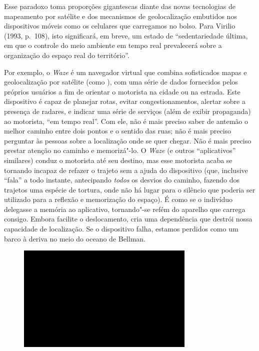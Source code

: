 Esse paradoxo toma proporções gigantescas diante das novas tecnologias
de mapeamento por satélite e dos mecanismos de geolocalização
embutidos nos dispositivos móveis como os celulares que carregamos no
bolso. Para Virilio (1993, p.~108), isto significará, em breve, um
estado de ``sedentariedade última, em que o controle do meio ambiente em
tempo real prevalecerá sobre a organização do espaço real do
território''.

Por exemplo, o \emph{Waze} é um navegador virtual que combina sofisticados
mapas e geolocalização por satélite (como ), com uma série de dados
fornecidos pelos próprios usuários a fim de orientar o motorista na
cidade ou na estrada. Este dispositivo é capaz de planejar rotas, evitar
congestionamentos, alertar sobre a presença de radares, e indicar uma
série de serviços (além de exibir propaganda) ao motorista, ``em tempo
real''. Com ele, não é mais preciso saber de antemão o melhor caminho
entre dois pontos e o sentido das ruas; não é mais preciso perguntar às
pessoas sobre a localização onde se quer chegar. Não é mais preciso
prestar atenção no caminho e memorizá"-lo. O \emph{Waze} (e outros
``aplicativos'' similares) conduz o motorista até seu destino, mas esse
motorista acaba se tornando incapaz de refazer o trajeto sem a ajuda do
dispositivo (que, inclusive ``fala'' a todo instante, antecipando
\emph{todos} os desvios do caminho, fazendo dos trajetos uma espécie de
tortura, onde não há lugar para o silêncio que poderia ser utilizado
para a reflexão e memorização do espaço). É como se o indivíduo delegasse
a memória ao aplicativo, tornando"-se refém do aparelho que carrega consigo.
Embora facilite o
deslocamento, cria uma dependência que destrói nossa capacidade de
localização. Se o dispositivo falha, estamos perdidos como um barco à deriva no meio do oceano de Bellman.

\begin{figure}[!ht]

\centering
 \includegraphics[width=85mm]{./imgs/im1.jpg}
\caption{\tiny{}}

\end{figure}

